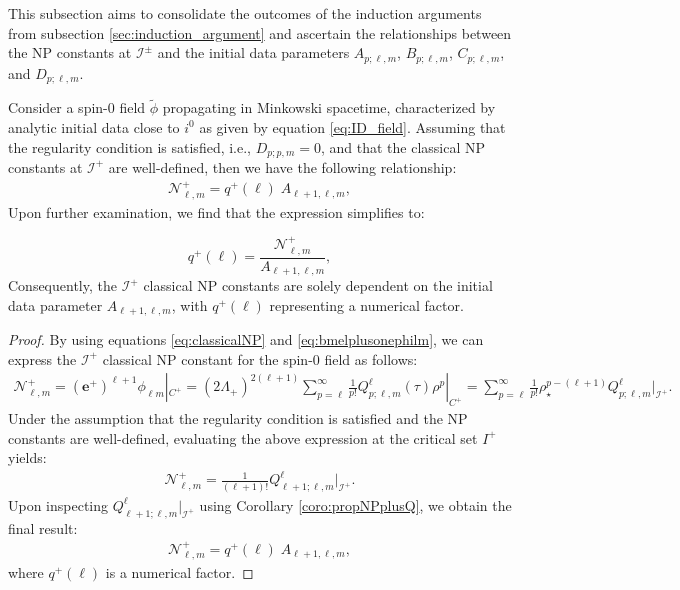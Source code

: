 This subsection aims to consolidate the outcomes of the induction arguments from subsection \ref{sec:induction_argument} and ascertain the relationships between the NP constants at $\mathscr{I}^{\pm}$ and the initial data parameters $A_{p;\ell,m}$, $B_{p;\ell,m}$, $C_{p;\ell,m}$, and $D_{p;\ell,m}$. \\

\begin{proposition}
  Consider a spin-0 field $\tilde{\phi}$ propagating in Minkowski spacetime, characterized by analytic initial data close to $i^0$ as given by equation \eqref{eq:ID_field}. Assuming that the regularity condition is satisfied, i.e., $D_{p;p,m}=0$, and that the classical NP constants at $\mathscr{I}^+$ are well-defined, then we have the following relationship:
   \begin{align}
     \mathcal{N}^{+}_{\ell,m}=q^{+}(\ell) \;A_{\ell+1,\ell,m},
   \end{align}
   Upon further examination, we find that the expression simplifies to:

   \[ q^{+}(\ell) = \frac{{\mathcal{N}^{+}_{\ell, m}}}{{A_{\ell+1, \ell, m}}}, \]
   Consequently, the $\mathscr{I}^+$ classical NP constants are solely dependent on the initial data parameter $A_{\ell+1, \ell, m}$, with $q^{+}(\ell)$ representing a numerical factor.
\end{proposition}

\begin{proof}
  By using equations \eqref{eq:classicalNP} and \eqref{eq:bmelplusonephilm}, we can express the $\mathscr{I}^+$ classical NP constant for the spin-0 field as follows:
  \begin{align}
    \mathcal{N}^{+}_{\ell,m} = (\boldsymbol{e}^{+})^{\ell+1}\phi_{\ell m}|_{{C}^{+}} = (2\Lambda_{+})^{2(\ell+1)}\sum_{p=\ell}^{\infty}\frac{1}{p!}Q^{\ell}_{p;\ell,m}(\tau)\rho^{p}|_{{C}^{+}} = \sum_{p=\ell}^{\infty}\frac{1}{p!}\rho_{\star}^{p-(\ell+1)}Q^{\ell}_{p;\ell,m}|_{\mathscr{I}^{+}}.
  \end{align}
  Under the assumption that the regularity condition is satisfied and the NP constants are well-defined, evaluating the above expression at the critical set $I^{+}$ yields:
  \begin{align}
  \mathcal{N}^{+}_{\ell,m} = \frac{1}{(\ell+1)!}Q^{\ell}_{\ell+1;\ell,m}|_{\mathscr{I}^{+}}.
  \end{align}
  Upon inspecting $Q^{\ell}_{\ell+1;\ell,m}|_{\mathscr{I}^{+}}$ using Corollary \ref{coro:propNPplusQ}, we obtain the final result:
  \begin{align}
  \mathcal{N}^{+}_{\ell,m} = q^{+}(\ell) \; A_{\ell+1, \ell,m},
  \end{align}
  where $q^{+}(\ell)$ is a numerical factor.
\end{proof}



